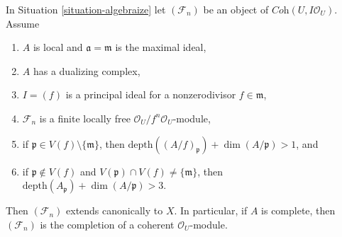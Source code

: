 %
\begin{lemma}
\label{lemma-algebraization-principal}
In Situation \ref{situation-algebraize} let $(\mathcal{F}_n)$ be an object
of $\textit{Coh}(U, I\mathcal{O}_U)$. Assume
\begin{enumerate}
\item $A$ is local and $\mathfrak a = \mathfrak m$ is the maximal ideal,
\item $A$ has a dualizing complex,
\item $I = (f)$ is a principal ideal for a nonzerodivisor $f \in \mathfrak m$,
\item $\mathcal{F}_n$ is a finite locally free
$\mathcal{O}_U/f^n\mathcal{O}_U$-module,
\item if $\mathfrak p \in V(f) \setminus \{\mathfrak m\}$, then
$\text{depth}((A/f)_\mathfrak p) + \dim(A/\mathfrak p) > 1$, and
\item if $\mathfrak p \not \in V(f)$ and
$V(\mathfrak p) \cap V(f) \not = \{\mathfrak m\}$, then
$\text{depth}(A_\mathfrak p) + \dim(A/\mathfrak p) > 3$.
\end{enumerate}
Then $(\mathcal{F}_n)$ extends canonically to $X$. In particular, if $A$
is complete, then $(\mathcal{F}_n)$ is the completion of a coherent
$\mathcal{O}_U$-module.
\end{lemma}

